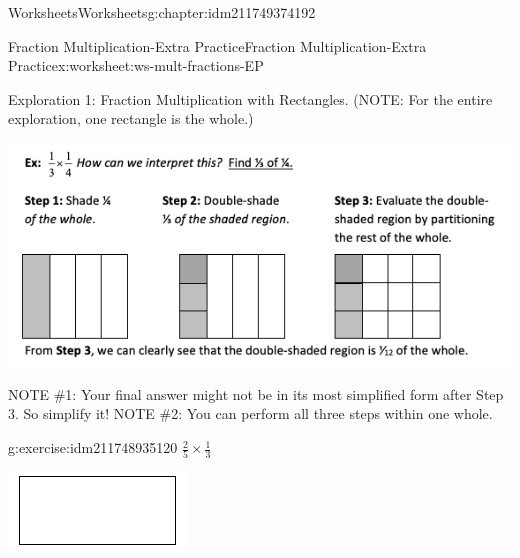 \documentclass[twoside,11pt,]{book}
\begin{document}
\begin{chapterptx}{Worksheets}{}{Worksheets}{}{}{g:chapter:idm211749374192}
\typeout{************************************************}
%
\begin{worksheet-section-numberless}{Fraction Multiplication-Extra Practice}{}{Fraction Multiplication-Extra Practice}{}{}{x:worksheet:ws-mult-fractions-EP}
\begin{introduction}{}%
Exploration 1: Fraction Multiplication with Rectangles. (NOTE: For the entire exploration, one rectangle is the whole.)%
\begin{sidebyside}{1}{0}{0}{0}%
\begin{sbspanel}{1}%
\includegraphics[width=1\linewidth]{images/frac-mult-rect.png}
\end{sbspanel}%
\end{sidebyside}%
\par
NOTE \#1: Your final answer might not be in its most simplified form after Step 3. So simplify it! NOTE \#2: You can perform all three steps within one whole.%
\end{introduction}%
\begin{divisionexercise}{1}{}{}{g:exercise:idm211748935120}%
\(\frac{2}{5} \times \frac{1}{3} \)%
\begin{sidebyside}{1}{0.2}{0.2}{0}%
\begin{sbspanel}{0.6}%
\includegraphics[width=1\linewidth]{images/generic-rectangle.png}
\end{sbspanel}%

\end{sidebyside}
\end{divisionexercise}
\end{worksheet-section-numberless}
\end{chapterptx}
\end{document}
